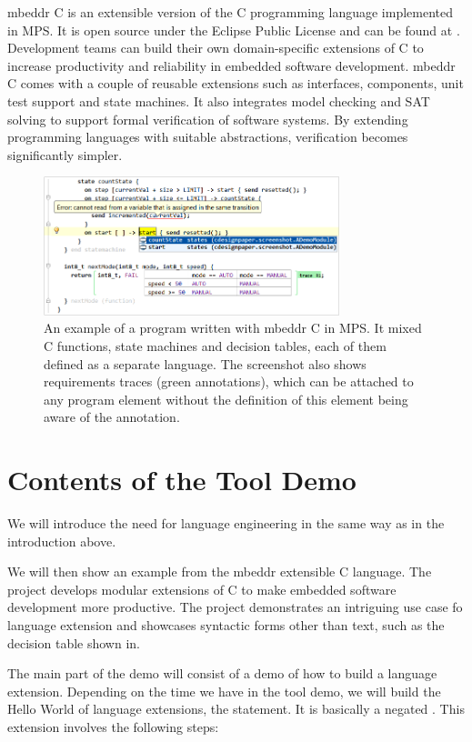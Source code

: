 \documentclass[10pt, conference, compsocconf]{IEEEtran}
\begin{document}
\noindent mbeddr C is an extensible version of the C
programming language implemented in MPS. It is open source under the Eclipse
Public License and can be found at . Development teams can
build their own domain-specific extensions of C to increase productivity and
reliability in embedded software development. mbeddr C comes with a couple of
reusable extensions such as interfaces, components, unit test support and state
machines. It also integrates model checking and SAT solving to support formal
verification of software systems. By extending programming languages with
suitable abstractions, verification becomes significantly simpler.


\begin{figure}[h]  
\includegraphics[width=8.6cm]{figures/screenshot.png}
\caption{An example of a program written with mbeddr C in MPS. It mixed C
functions, state machines and decision tables, each of them defined as a separate
language. The screenshot also shows requirements traces (green annotations),
which can be attached to any program element without the definition of this
element being aware of the annotation.}
\label{screenshot}
\end{figure}

\section{Contents of the Tool Demo}

 We will introduce the need for language engineering in
the same way as in the introduction above. 

 We will then show an example from the mbeddr
extensible C language. The project develops modular extensions of
C to make embedded software development more productive. The project
demonstrates an intriguing use case fo language extension and showcases
syntactic forms other than text, such as the decision table shown in.

 The main part of the demo will consist of a demo of how
to build a language extension. Depending on the time we have in the tool demo,
we will build the Hello World of language extensions, the  statement.
It is basically a negated . This extension involves the following steps:
\end{document}
